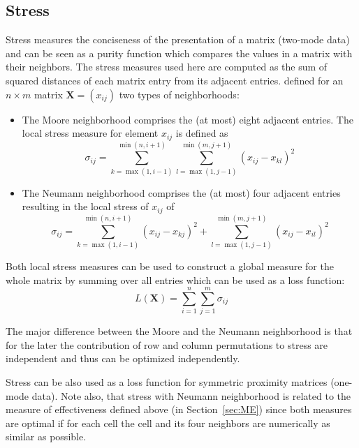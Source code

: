 \documentclass[fleqn, a4paper]{article}
\begin{document}
\subsection{Stress}
\label{sec:stress}

Stress measures the conciseness of the presentation of a matrix
(two-mode data) and can be seen as a purity function which compares the
values in a matrix with their neighbors.  The stress measures used here
are computed as the sum of squared distances of each matrix entry from
its adjacent entries.  \cite{seriation:Niermann:2005} defined for an $n
\times m$ matrix $\mathbf{X} = (x_{ij})$ two types of neighborhoods:

\begin{itemize}
    \item The Moore neighborhood comprises the (at most) eight adjacent entries.
        The local stress measure for element $x_{ij}$ is defined as
        \begin{equation}
            \sigma_{ij} = \sum_{k=\max(1,i-1)}^{\min(n,i+1)} 
                \sum_{l=\max(1,j-1)}^{\min(m,j+1)} 
                (x_{ij} - x_{kl})^2
        \end{equation}

    \item The Neumann neighborhood comprises the (at most) four adjacent entries
        resulting in the local stress of $x_{ij}$ of
        \begin{equation}
            \sigma_{ij} = 
            \sum_{k=\max(1,i-1)}^{\min(n,i+1)} (x_{ij} - x_{kj})^2 + 
            \sum_{l=\max(1,j-1)}^{\min(m,j+1)} (x_{ij} - x_{il})^2
        \end{equation}
\end{itemize}

Both local stress measures can be used to construct a global measure for the
whole matrix by summing over all entries which can be used as a loss function:
\begin{equation}
    L(\mathbf{X}) = 
    \sum_{i=1}^n \sum_{j=1}^m \sigma_{ij}
\end{equation}

The major difference between the Moore and the Neumann neighborhood is that for
the later the contribution of row and column permutations to stress are
independent and thus can be optimized independently. 

Stress can be also used as a loss function for
symmetric proximity matrices (one-mode data).
Note also, that stress with Neumann
neighborhood is related to the measure of effectiveness defined above (in
Section~\ref{sec:ME}) since both measures are optimal if for each cell the cell
and its four neighbors are numerically as similar as possible.
\end{document}
